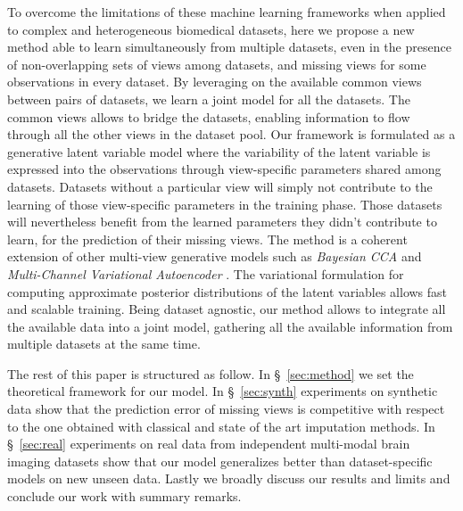 To overcome the limitations of these machine learning frameworks when applied to complex and heterogeneous biomedical datasets, here we propose a new method able to learn simultaneously from multiple datasets, even in the presence of non-overlapping sets of views among datasets, and missing views for some observations in every dataset.
By leveraging on the available common views between pairs of datasets, we learn a joint model for all the datasets.
The common views allows to bridge the datasets, enabling information to flow through all the other views in the dataset pool.
Our framework  is formulated as a generative latent variable model where the variability of the latent variable is expressed into the observations through view-specific parameters shared among datasets.
Datasets without a particular view will simply not contribute to the learning of those view-specific parameters in the training phase.
Those datasets will nevertheless benefit from the learned parameters they didn't contribute to learn, for the prediction of their missing views.
The method is a coherent extension of other multi-view generative models such as \textit{Bayesian CCA} \citep{ Klami2013} and \textit{Multi-Channel Variational Autoencoder} \citep{Antelmi2019}.
The variational formulation for computing approximate posterior distributions of the latent variables allows fast and scalable training.
Being dataset agnostic, our method allows to integrate all the available data into a joint model, gathering  all the available information from multiple datasets at the same time.

The rest of this paper is structured as follow.
In \S~\ref{sec:method} we set the theoretical framework for our model.
In \S~\ref{sec:synth} experiments on synthetic data show that the prediction error of missing views is competitive with respect to the one obtained with classical and state of the art imputation methods.
In \S~\ref{sec:real} experiments on real data from independent multi-modal brain imaging datasets show that our model generalizes better than dataset-specific models on new unseen data.
Lastly we broadly discuss our results and limits and conclude our work with summary remarks.
